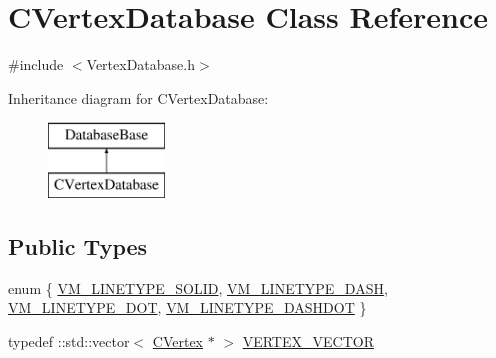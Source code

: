 \hypertarget{class_c_vertex_database}{}\section{C\+Vertex\+Database Class Reference}
\label{class_c_vertex_database}


{\ttfamily \#include $<$Vertex\+Database.\+h$>$}

Inheritance diagram for C\+Vertex\+Database\+:\begin{figure}[H]
\begin{center}
\leavevmode
\includegraphics[height=2.000000cm]{class_c_vertex_database}
\end{center}
\end{figure}
\subsection*{Public Types}
\begin{DoxyCompactItemize}
\item 
enum \{ \hyperlink{class_c_vertex_database_aed0cf911bf59c8769d4edc7e8daae096a25464a1568c7db3e0f75b5b49e539431}{V\+M\+\_\+\+L\+I\+N\+E\+T\+Y\+P\+E\+\_\+\+S\+O\+L\+I\+D}, 
\hyperlink{class_c_vertex_database_aed0cf911bf59c8769d4edc7e8daae096a8d41cc06ef185f7c679bdfc3bd96c7a8}{V\+M\+\_\+\+L\+I\+N\+E\+T\+Y\+P\+E\+\_\+\+D\+A\+S\+H}, 
\hyperlink{class_c_vertex_database_aed0cf911bf59c8769d4edc7e8daae096ade9507cf359ecb43c58f2be9a3ee1472}{V\+M\+\_\+\+L\+I\+N\+E\+T\+Y\+P\+E\+\_\+\+D\+O\+T}, 
\hyperlink{class_c_vertex_database_aed0cf911bf59c8769d4edc7e8daae096a7d3f4e969e53c45502f22dc6f1d5f300}{V\+M\+\_\+\+L\+I\+N\+E\+T\+Y\+P\+E\+\_\+\+D\+A\+S\+H\+D\+O\+T}
 \}
\item 
typedef \+::std\+::vector$<$ \hyperlink{class_c_vertex}{C\+Vertex} $\ast$ $>$ \hyperlink{class_c_vertex_database_acb0633bfbb4ada0121b0bc4e523e0f8c}{V\+E\+R\+T\+E\+X\+\_\+\+V\+E\+C\+T\+O\+R}
\end{DoxyCompactItemize}
